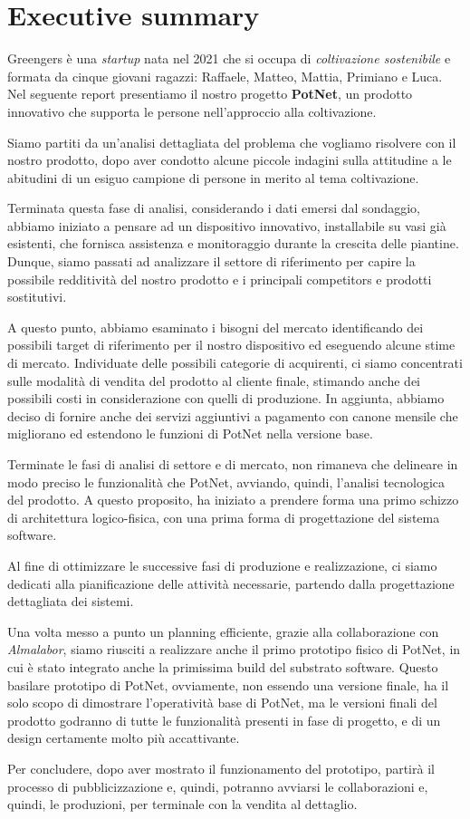 \section{Executive summary}

Greengers è una \textit{startup} nata nel 2021 che si occupa di \textit{coltivazione sostenibile} e formata da cinque giovani ragazzi: Raffaele, Matteo, Mattia, Primiano e Luca. Nel seguente report presentiamo il nostro progetto \textbf{PotNet}, un prodotto innovativo che supporta le persone nell'approccio alla coltivazione.

Siamo partiti da un'analisi dettagliata del problema che vogliamo risolvere con il nostro prodotto, dopo aver condotto alcune piccole indagini sulla attitudine a le abitudini di un esiguo campione di persone in merito al tema coltivazione.

Terminata questa fase di analisi, considerando i dati emersi dal sondaggio, abbiamo iniziato a pensare ad un dispositivo innovativo, installabile su vasi già esistenti, che fornisca assistenza e monitoraggio durante la crescita delle piantine.
Dunque, siamo passati ad analizzare il settore di riferimento per capire la possibile redditività del nostro prodotto e i principali competitors e prodotti sostitutivi.

A questo punto, abbiamo esaminato i bisogni del mercato identificando dei possibili target di riferimento per il nostro dispositivo ed eseguendo alcune stime di mercato.
Individuate delle possibili categorie di acquirenti, ci siamo concentrati sulle modalità di vendita del prodotto al cliente finale, stimando anche dei possibili costi in considerazione con quelli di produzione. In aggiunta, abbiamo deciso di fornire anche dei servizi aggiuntivi a pagamento con canone mensile che migliorano ed estendono le funzioni di PotNet nella versione base.

Terminate le fasi di analisi di settore e di mercato, non rimaneva che delineare in modo preciso le funzionalità che PotNet, avviando, quindi, l'analisi tecnologica del prodotto. A questo proposito, ha iniziato a prendere forma una primo schizzo di architettura logico-fisica, con una prima forma di progettazione del sistema software.

Al fine di ottimizzare le successive fasi di produzione e realizzazione, ci siamo dedicati alla pianificazione delle attività necessarie, partendo dalla progettazione dettagliata dei sistemi.

Una volta messo a punto un planning efficiente, grazie alla collaborazione con \textit{Almalabor}, siamo riusciti a realizzare anche il primo prototipo fisico di PotNet, in cui è stato integrato anche la primissima build del substrato software.
Questo basilare prototipo di PotNet, ovviamente, non essendo una versione finale, ha il solo scopo di dimostrare l'operatività base di PotNet, ma le versioni finali del prodotto godranno di tutte le funzionalità presenti in fase di progetto, e di un design certamente molto più accattivante.

Per concludere, dopo aver mostrato il funzionamento del prototipo, partirà il processo di pubblicizzazione e, quindi, potranno avviarsi le collaborazioni e, quindi, le produzioni, per terminale con la vendita al dettaglio.


